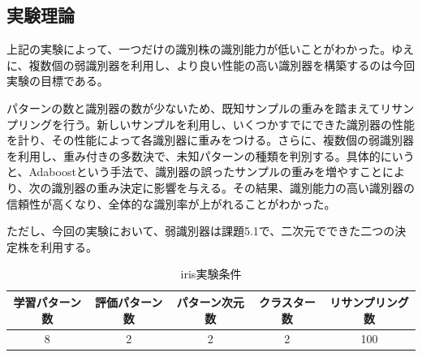 \documentclass[ %
  uplatex,%
  papersize%
]{jsarticle}
\begin{document}
\subsection{実験理論}

上記の実験によって、一つだけの識別株の識別能力が低いことがわかった。ゆえに、複数個の弱識別器を利用し、より良い性能の高い識別器を構築するのは今回実験の目標である。

パターンの数と識別器の数が少ないため、既知サンプルの重みを踏まえてリサンプリングを行う。新しいサンプルを利用し、いくつかすでにできた識別器の性能を計り、その性能によって各識別器に重みをつける。さらに、複数個の弱識別器を利用し、重み付きの多数決で、未知パターンの種類を判別する。具体的にいうと、Adaboostという手法で、識別器の誤ったサンプルの重みを増やすことにより、次の識別器の重み決定に影響を与える。その結果、識別能力の高い識別器の信頼性が高くなり、全体的な識別率が上がれることがわかった。

ただし、今回の実験において、弱識別器は課題5.1で、二次元でできた二つの決定株を利用する。
\begin{table}[h]\footnotesize
\caption{iris実験条件}
\label{}
\centering
\begin{tabular}{|c|c|c|c|c|}
\hline
学習パターン数&評価パターン数&パターン次元数&クラスター数&リサンプリング数\\
\hline
8&2&2&2&100\\
\hline
\end{tabular} 
\end{table}
\end{document}
